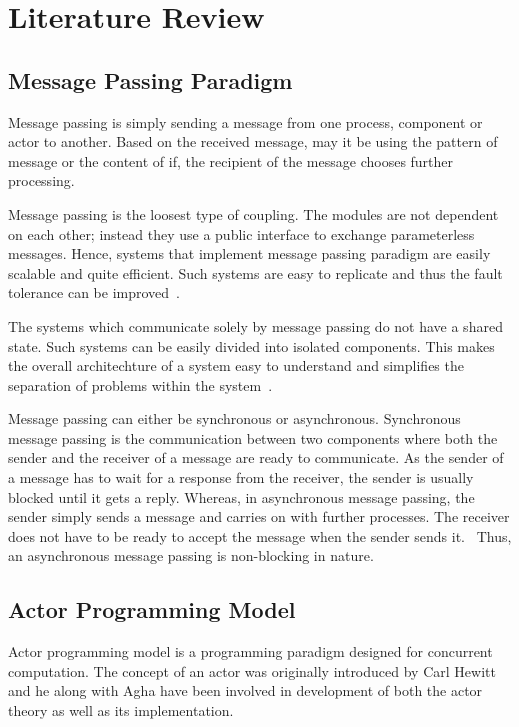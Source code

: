 \chapter{Literature Review}\label{chapter:literature_review}

\section{Message Passing Paradigm}
\label{sec:messagePassing}
  Message passing is simply sending a message from one process, component or actor to another. Based on the received message, may it be using the pattern of message or the content of if, the recipient of the message chooses further processing.

  Message passing is the loosest type of coupling. The modules are not dependent on each other; instead they use a public interface to exchange parameterless messages\cite{joecelko}. Hence, systems that implement message passing paradigm are easily scalable and quite efficient. Such systems are easy to replicate and thus the fault tolerance can be improved~\cite{Armstrong:2010:ERL:1810891.1810910}.

  The systems which communicate solely by message passing do not have a shared state. Such systems can be easily divided into isolated components. This makes the overall architechture of a system easy to understand and simplifies the separation of problems within the system~\cite{Armstrong:2010:ERL:1810891.1810910}.

  Message passing can either be synchronous or asynchronous. Synchronous message passing is the communication between two components where both the sender and the receiver of a message are ready to communicate. As the sender of a message has to wait for a response from the receiver, the sender is usually blocked until it gets a reply. Whereas, in asynchronous message passing, the sender simply sends a message and carries on with further processes. The receiver does not have to be ready to accept the message when the sender sends it.~\cite{agha} Thus, an asynchronous message passing is non-blocking in nature.

\section{Actor Programming Model}
\label{sec:actorProgramming}
  Actor programming model is a programming paradigm designed for concurrent computation. The concept of an actor was originally introduced by Carl Hewitt\cite{hewitt} and he along with Agha\cite{agha} have been involved in development of both the actor theory as well as its implementation.

